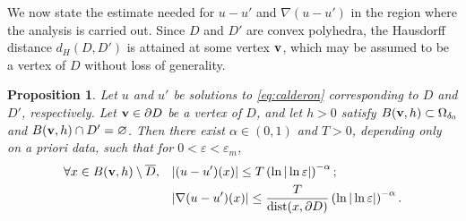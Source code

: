 ﻿\documentclass[11pt,reqno,oneside]{amsart}
\newtheorem{proposition}[theorem]{Proposition}
\theoremstyle{definition}
\theoremstyle{remark}
\newcommand{\n}{\nabla}
\newcommand{\dist}{{\rm dist}}
\renewcommand{\a}{\alpha}
\renewcommand{\d}{\delta}
\newcommand{\e}{\varepsilon}
\newcommand{\p}{\partial}
\renewcommand{\O}{\Omega}
\begin{document}
    \medskip

    We now state the estimate needed for $u-u'$ and $\n(u-u')$ in the region where the analysis is carried out. Since $D$ and $D'$ are convex polyhedra, the Hausdorff distance $d_H(D,D')$ is attained at some vertex $\bf v$, which may be assumed to be a vertex of $D$ without loss of generality.

    \begin{proposition}\label{prop:propa-small}
        Let $u$ and $u'$ be solutions to \eqref{eq:calderon} corresponding to $D$ and $D'$, respectively. Let ${\bf v} \in \p D$ be a vertex of $D$, and let $h>0$ satisfy $B({\bf v},h)\subset\O_{\d_0}$ and $B({\bf v},h)\cap D'=\varnothing$. Then there exist $\a \in (0,1)$ and $T>0$, depending only on {\it a priori} data, such that for $0<\e<\e_m$,
        \begin{align*}
            \forall x\in B({\bf v},h)\setminus \overline{D},\quad & |(u-u')(x)|\leq T\left(\ln |\ln \e|\right)^{-\a};\\
            &|\n (u-u')(x)|\leq \frac{T}{\dist(x,\p D)}\left(\ln |\ln \e|\right)^{-\a}.
        \end{align*}
    \end{proposition}
\end{document}
